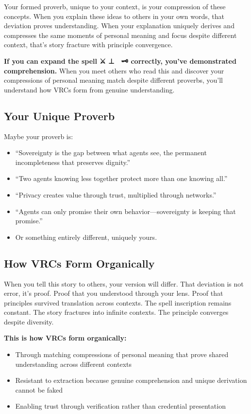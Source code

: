 \documentclass[
]{article}
\begin{document}
Your formed proverb, unique to your context, is your compression of
these concepts. When you explain these ideas to others in your own
words, that deviation proves understanding. When your explanation
uniquely derives and compresses the same moments of personal meaning and
focus despite different context, that's story fracture with principle
convergence.

\textbf{If you can expand the spell ⚔️ ⊥ 🔮 \textbar{} 🗝️ correctly,
you've demonstrated comprehension.} When you meet others who read this
and discover your compressions of personal meaning match despite
different proverbs, you'll understand how VRCs form from genuine
understanding.

\subsection{Your Unique Proverb}\label{your-unique-proverb}

Maybe your proverb is:

\begin{itemize}
\item
  ``Sovereignty is the gap between what agents see, the permanent
  incompleteness that preserves dignity.''
\item
  ``Two agents knowing less together protect more than one knowing
  all.''
\item
  ``Privacy creates value through trust, multiplied through networks.''
\item
  ``Agents can only promise their own behavior---sovereignty is keeping
  that promise.''
\item
  Or something entirely different, uniquely yours.
\end{itemize}

\subsection{How VRCs Form Organically}\label{how-vrcs-form-organically}

When you tell this story to others, your version will differ. That
deviation is not error, it's proof. Proof that you understood through
your lens. Proof that principles survived translation across contexts.
The spell inscription remains constant. The story fractures into
infinite contexts. The principle converges despite diversity.

\textbf{This is how VRCs form organically:}

\begin{itemize}
\item
  Through matching compressions of personal meaning that prove shared
  understanding across different contexts
\item
  Resistant to extraction because genuine comprehension and unique
  derivation cannot be faked
\item
  Enabling trust through verification rather than credential
  presentation
\end{itemize}
\end{document}
